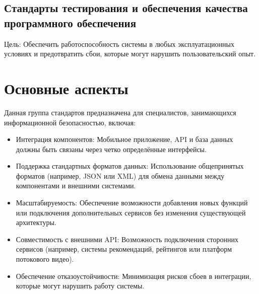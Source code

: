 \subsection{Стандарты тестирования и обеспечения качества программного обеспечения}

Цель: Обеспечить работоспособность системы в любых эксплуатационных условиях и предотвратить сбои, которые могут нарушить пользовательский опыт.
\section*{Основные аспекты}
Данная группа стандартов предназначена для специалистов, занимающихся информационной безопасностью, включая:
\begin{itemize}
    \item Интеграция компонентов: Мобильное приложение, API и база данных должны быть связаны через четко определённые интерфейсы.
    \item Поддержка стандартных форматов данных: Использование общепринятых форматов (например, JSON или XML) для обмена данными между компонентами и внешними системами.
    \item Масштабируемость: Обеспечение возможности добавления новых функций или подключения дополнительных сервисов без изменения существующей архитектуры.
    \item Совместимость с внешними API: Возможность подключения сторонних сервисов (например, системы рекомендаций, рейтингов или платформ потокового видео).
    \item Обеспечение отказоустойчивости: Минимизация рисков сбоев в интеграции, которые могут нарушить работу системы.
\end{itemize}